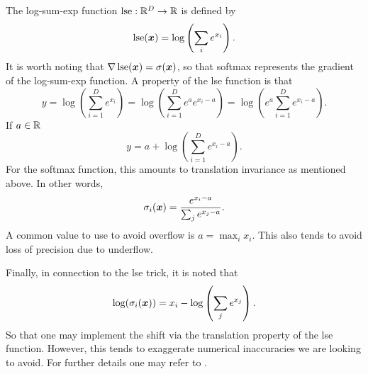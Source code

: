  The log-sum-exp function \(\operatorname{lse}:\mathbb R^D\rightarrow\mathbb R\) is defined by 
 \[\operatorname{lse}(\bm x) = \log\left(\sum_i e^{x_i}\right).\]
 It is worth noting that \(\nabla\operatorname{lse}(\bm x) = \sigma(\bm x)\), so that softmax 
 represents the gradient of the log-sum-exp function. A property of the 
 lse function  is that 
 \[y = \log\left(\sum_{i=1}^{D} e^{x_i}\right) = \log\left(\sum_{i=1}^{D} e^a
 e^{x_i-a}\right) = \log\left(e^a\sum_{i=1}^{D} e^{x_i-a}\right).\]
 If \(a\in\mathbb R\)
 \[y = a + \log\left(\sum_{i=1}^{D} e^{x_i-a}\right).\]
 For the softmax function, this amounts to translation invariance as mentioned 
 above.  In other words,
\[\sigma_i(\bm x) = \frac{e^{x_i-a}}{\sum_{j} e^{x_j-a}}.\]
A common value to use to avoid overflow is \(a =\max_i x_i\). This also tends 
to avoid loss of precision due to underflow.

Finally, in connection to the lse trick, it is noted that 
\[\log(\sigma_i(\bm x)) = x_i - \log\left(\sum_j e^{x_j}\right).\]
So that one may implement the shift via the translation property of the lse 
function.  However, this tends to exaggerate numerical inaccuracies we are looking 
to avoid. For further details one may refer to \cite{AccurateSoftmax}.

%
%
%
